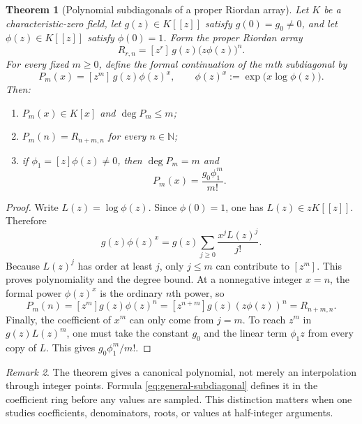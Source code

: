 \documentclass[11pt,oneside]{article}
\newtheorem{theorem}{Theorem}[section]
\theoremstyle{definition}
\theoremstyle{remark}
\newtheorem{remark}[theorem]{Remark}
\newcommand{\N}{\mathbb N}
\newcommand{\coeff}[2]{[z^{#1}]\,#2}
\begin{document}
\begin{theorem}[Polynomial subdiagonals of a proper Riordan array]
\label{thm:general-riordan-diagonal}
Let $K$ be a characteristic-zero field, let
$g(z)\in K[[z]]$ satisfy $g(0)=g_0\ne0$, and let
$\phi(z)\in K[[z]]$ satisfy $\phi(0)=1$.  Form the proper Riordan array
\[
 R_{r,n}=\coeff{r}{g(z)\bigl(z\phi(z)\bigr)^n}.
\]
For every fixed $m\ge0$, define the formal continuation of the $m$th
subdiagonal by
\begin{equation}
 P_m(x)=\coeff{m}{g(z)\phi(z)^x},
 \qquad
 \phi(z)^x:=\exp\!\bigl(x\log\phi(z)\bigr).
 \label{eq:general-subdiagonal}
\end{equation}
Then:
\begin{enumerate}
 \item $P_m(x)\in K[x]$ and $\deg P_m\le m$;
 \item $P_m(n)=R_{n+m,n}$ for every $n\in\N$;
 \item if $\phi_1=[z]\phi(z)\ne0$, then $\deg P_m=m$ and
 \begin{equation}
  [x^m]P_m(x)=\frac{g_0\phi_1^m}{m!}.
  \label{eq:general-leading}
 \end{equation}
\end{enumerate}
\end{theorem}

\begin{proof}
Write $L(z)=\log\phi(z)$.  Since $\phi(0)=1$, one has
$L(z)\in zK[[z]]$.  Therefore
\[
 g(z)\phi(z)^x
 =g(z)\sum_{j\ge0}\frac{x^jL(z)^j}{j!}.
\]
Because $L(z)^j$ has order at least $j$, only $j\le m$ can contribute to
$[z^m]$.  This proves polynomiality and the degree bound.  At a
nonnegative integer $x=n$, the formal power $\phi(z)^x$ is the ordinary
$n$th power, so
\[
 P_m(n)=[z^m]g(z)\phi(z)^n
       =[z^{n+m}]g(z)(z\phi(z))^n
       =R_{n+m,n}.
\]
Finally, the coefficient of $x^m$ can only come from $j=m$.  To reach
$z^m$ in $g(z)L(z)^m$, one must take the constant $g_0$ and the linear term
$\phi_1z$ from every copy of $L$.  This gives
$g_0\phi_1^m/m!$.
\end{proof}

\begin{remark}
The theorem gives a canonical polynomial, not merely an interpolation through
integer points.  Formula \eqref{eq:general-subdiagonal} defines it in the
coefficient ring before any values are sampled.  This distinction matters
when one studies coefficients, denominators, roots, or values at half-integer
arguments.
\end{remark}
\end{document}
